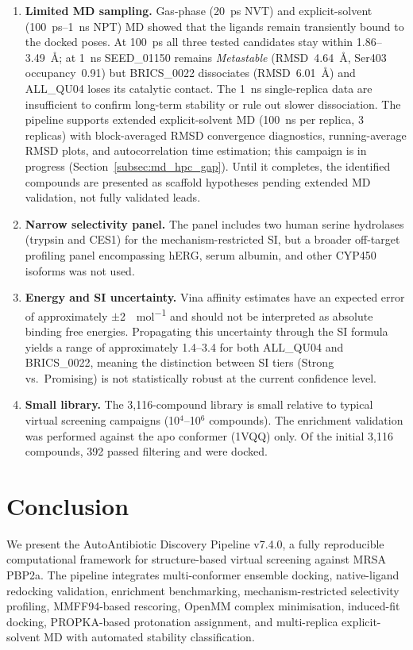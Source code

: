 \documentclass[12pt]{article}
\begin{document}
\begin{enumerate}
    \item \textbf{Limited MD sampling.} Gas-phase (20~ps NVT) and explicit-solvent (100~ps--1~ns NPT) MD showed that the ligands remain transiently bound to the docked poses. At 100~ps all three tested candidates stay within 1.86--3.49~\si{\angstrom}; at 1~ns SEED\_01150 remains \emph{Metastable} (RMSD~4.64~\si{\angstrom}, Ser403 occupancy~0.91) but BRICS\_0022 dissociates (RMSD~6.01~\si{\angstrom}) and ALL\_QU04 loses its catalytic contact. The 1~ns single-replica data are insufficient to confirm long-term stability or rule out slower dissociation. The pipeline supports extended explicit-solvent MD (100~ns per replica, 3 replicas) with block-averaged RMSD convergence diagnostics, running-average RMSD plots, and autocorrelation time estimation; this campaign is in progress (Section~\ref{subsec:md_hpc_gap}). Until it completes, the identified compounds are presented as scaffold hypotheses pending extended MD validation, not fully validated leads.

    \item \textbf{Narrow selectivity panel.} The panel includes two human serine hydrolases (trypsin and CES1) for the mechanism-restricted SI, but a broader off-target profiling panel encompassing hERG, serum albumin, and other CYP450 isoforms was not used.

    \item \textbf{Energy and SI uncertainty.} Vina affinity estimates have an expected error of approximately $\pm$\SI{2}{\kcal\per\mol} and should not be interpreted as absolute binding free energies. Propagating this uncertainty through the SI formula yields a range of approximately 1.4--3.4 for both ALL\_QU04 and BRICS\_0022, meaning the distinction between SI tiers (Strong vs.\ Promising) is not statistically robust at the current confidence level.

    \item \textbf{Small library.} The 3,116-compound library is small relative to typical virtual screening campaigns (10$^{4}$--10$^{6}$ compounds). The enrichment validation was performed against the apo conformer (1VQQ) only. Of the initial 3,116 compounds, 392 passed filtering and were docked.
\end{enumerate}

\section{Conclusion}

We present the AutoAntibiotic Discovery Pipeline v7.4.0, a fully reproducible computational framework for structure-based virtual screening against MRSA PBP2a. The pipeline integrates multi-conformer ensemble docking, native-ligand redocking validation, enrichment benchmarking, mechanism-restricted selectivity profiling, MMFF94-based rescoring, OpenMM complex minimisation, induced-fit docking, PROPKA-based protonation assignment, and multi-replica explicit-solvent MD with automated stability classification.
\end{document}
